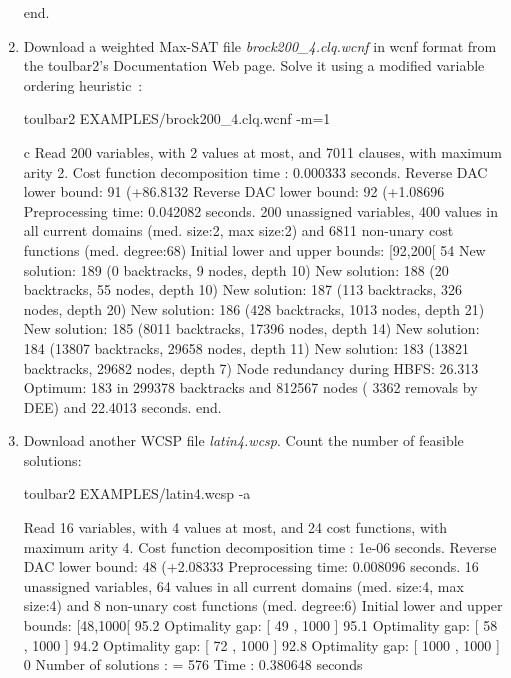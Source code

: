 \begin{enumerate}
{\begin{DoxyCode}
end.
\end{DoxyCode}}
\item Download a weighted Max-SAT file {\em brock200\_4.clq.wcnf} in wcnf format from the toulbar2's Documentation Web page. Solve it using a modified variable ordering heuristic~\cite{Schiex14a}:
\begin{DoxyCode}
	toulbar2 EXAMPLES/brock200_4.clq.wcnf -m=1
\end{DoxyCode}
{\scriptsize
\begin{DoxyCode}
c Read 200 variables, with 2 values at most, and 7011 clauses, with maximum arity 2.
Cost function decomposition time : 0.000333 seconds.
Reverse DAC lower bound: 91 (+86.8132%
Reverse DAC lower bound: 92 (+1.08696%
Preprocessing time: 0.042082 seconds.
200 unassigned variables, 400 values in all current domains (med. size:2, max size:2) and 6811 non-unary cost functions (med. degree:68)
Initial lower and upper bounds: [92,200[ 54%
New solution: 189 (0 backtracks, 9 nodes, depth 10)
New solution: 188 (20 backtracks, 55 nodes, depth 10)
New solution: 187 (113 backtracks, 326 nodes, depth 20)
New solution: 186 (428 backtracks, 1013 nodes, depth 21)
New solution: 185 (8011 backtracks, 17396 nodes, depth 14)
New solution: 184 (13807 backtracks, 29658 nodes, depth 11)
New solution: 183 (13821 backtracks, 29682 nodes, depth 7)
Node redundancy during HBFS: 26.313 %
Optimum: 183 in 299378 backtracks and 812567 nodes ( 3362 removals by DEE) and 22.4013 seconds.
end.
\end{DoxyCode}}
\item Download another WCSP file {\em latin4.wcsp}. Count the number of feasible solutions:
\begin{DoxyCode}
	toulbar2 EXAMPLES/latin4.wcsp -a
\end{DoxyCode}
{\scriptsize
\begin{DoxyCode}
Read 16 variables, with 4 values at most, and 24 cost functions, with maximum arity 4.
Cost function decomposition time : 1e-06 seconds.
Reverse DAC lower bound: 48 (+2.08333%
Preprocessing time: 0.008096 seconds.
16 unassigned variables, 64 values in all current domains (med. size:4, max size:4) and 8 non-unary cost functions (med. degree:6)
Initial lower and upper bounds: [48,1000[ 95.2%
Optimality gap: [ 49 , 1000 ] 95.1 %
Optimality gap: [ 58 , 1000 ] 94.2 %
Optimality gap: [ 72 , 1000 ] 92.8 %
Optimality gap: [ 1000 , 1000 ] 0 %
Number of solutions    : =  576
Time                   :    0.380648 seconds

\end{DoxyCode}}
\end{enumerate}
